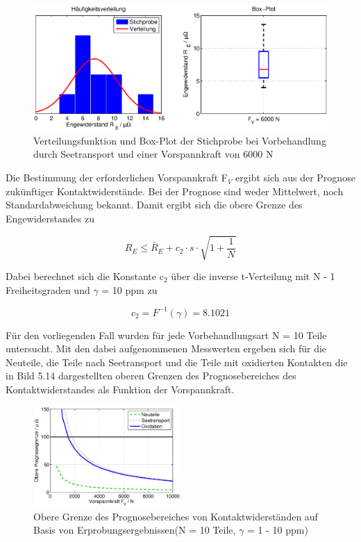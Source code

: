 \noindent 
\begin{figure}[H]
  \centerline{\includegraphics[width=1\textwidth]{Kapitel5/Bilder/image13}}
  \caption{Verteilungsfunktion und Box-Plot der Stichprobe bei Vorbehandlung durch Seetransport und einer Vorspannkraft von 6000 N}
  \label{fig:Batteriesensor3}
\end{figure}

\noindent Die Bestimmung der erforderlichen Vorspannkraft F$_{V}$ ergibt sich aus der Prognose zuk\"{u}nftiger Kontaktwiderst\"{a}nde. Bei der Prognose sind weder Mittelwert, noch Standardabweichung bekannt. Damit ergibt sich die obere Grenze des Engewiderstandes zu

\begin{equation}\label{eq:fivehundredsixty}
R_{E} \le \bar{R}_{E} +c_{2} \cdot s\cdot \sqrt{1+\dfrac{1}{N}}
\end{equation}

\noindent Dabei berechnet sich die Konstante c$_{2}$ \"{u}ber die inverse t-Verteilung mit N - 1 Freiheitsgraden und $\gamma$ = 10 ppm zu

\begin{equation}\label{eq:fivehundredsixtyone}
c_{2} =F^{-1} (\gamma)=8.1021
\end{equation}

\noindent F\"{u}r den vorliegenden Fall wurden f\"{u}r jede Vorbehandlungsart N = 10 Teile untersucht. Mit den dabei aufgenommenen Messwerten ergeben sich f\"{u}r die Neuteile, die Teile nach Seetransport und die Teile mit oxidierten Kontakten die in Bild 5.14 dargestellten oberen Grenzen des Prognosebereiches des Kontaktwiderstandes als Funktion der Vorspannkraft.

\noindent 
\begin{figure}[H]
  \centerline{\includegraphics[width=0.5\textwidth]{Kapitel5/Bilder/image14}}
  \caption{Obere Grenze des Prognosebereiches von Kontaktwiderst\"{a}nden auf Basis von Erprobungsergebnissen(N = 10 Teile, $\gamma$ = 1 - 10 ppm)}
  \label{fig:Batteriesensor4}
\end{figure}

